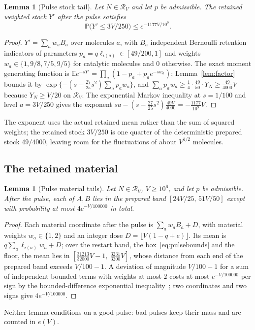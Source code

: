 \documentclass[11pt,a4paper]{article}
\theoremstyle{plain}
\newtheorem{lemma}[theorem]{Lemma}
\theoremstyle{definition}
\theoremstyle{remark}
\newcommand{\Prob}{\mathbb P}
\newcommand{\E}{\mathbb E}
\newcommand{\cR}{\mathcal R}
\begin{document}
\begin{lemma}[Pulse stock tail]\label{lem:pulsestock}
Let $N\in\cR_V$ and let $p$ be admissible. The retained weighted stock $Y'$ after the pulse satisfies
\[
\Prob\bigl(Y'\le3V/250\bigr)\le e^{-1177V/10^{9}}.
\]
\end{lemma}
\begin{proof}
$Y'=\sum_aw_aB_a$ over molecules $a$, with $B_a$ independent Bernoulli retention indicators of parameters $p_a=q\ell_{i(a)}\in[49/200,1]$ and weights $w_a\in\{1,9/8,7/5,9/5\}$ for catalytic molecules and $0$ otherwise. The exact moment generating function is $\E e^{-sY'}=\prod_a(1-p_a+p_ae^{-sw_a})$; Lemma~\ref{lem:factor} bounds it by $\exp\{-(s-\tfrac{27}{25}s^2)\sum_ap_aw_a\}$, and $\sum_ap_aw_a\ge\tfrac14\cdot\tfrac{49}{50}\cdot Y_N\ge\tfrac{49}{4000}V$ because $Y_N\ge V/20$ on $\cR_V$. The exponential Markov inequality at $s=1/100$ and level $a=3V/250$ gives the exponent $sa-(s-\tfrac{27}{25}s^2)\tfrac{49V}{4000}=-\tfrac{1177}{10^9}V$.
\end{proof}
The exponent uses the actual retained mean rather than the sum of squared weights; the retained stock $3V/250$ is one quarter of the deterministic prepared stock $49/4000$, leaving room for the fluctuations of about $V^{1/2}$ molecules.

\subsection{The retained material}
\begin{lemma}[Pulse material tails]\label{lem:pulsematerial}
Let $N\in\cR_V$, $V\ge10^6$, and let $p$ be admissible. After the pulse, each of $A,B$ lies in the prepared band $[24V/25,\,51V/50]$ except with probability at most $4e^{-V/100000}$ in total.
\end{lemma}
\begin{proof}
Each material coordinate after the pulse is $\sum_aw_aB_a+D$, with material weights $w_a\in\{1,2\}$ and an integer dose $D=\lfloor V(1-q+e)\rfloor$. Its mean is $q\sum_a\ell_{i(a)}w_a+D$; over the restart band, the box~\eqref{eq:pulsebounds} and the floor, the mean lies in $[\tfrac{31213}{32000}V-1,\ \tfrac{3231}{3200}V]$, whose distance from each end of the prepared band exceeds $V/100-1$. A deviation of magnitude $V/100-1$ for a sum of independent bounded terms with weights at most $2$ costs at most $e^{-V/100000}$ per sign by the bounded-difference exponential inequality~\citep{hoeffding1963}; two coordinates and two signs give $4e^{-V/100000}$.
\end{proof}
Neither lemma conditions on a good pulse: bad pulses keep their mass and are counted in $e(V)$.
\end{document}
